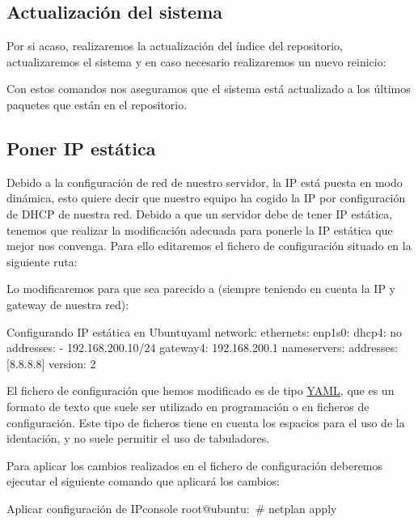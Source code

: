 \subsection{Actualización del sistema}
Por si acaso, realizaremos la actualización del índice del repositorio, actualizaremos el sistema y en caso necesario realizaremos un nuevo reinicio:


Con estos comandos nos aseguramos que el sistema está actualizado a los últimos paquetes que están en el repositorio.

\subsection{Poner IP estática}
Debido a la configuración de red de nuestro servidor, la IP está puesta en modo dinámica, esto quiere decir que nuestro equipo ha cogido la IP por configuración de DHCP de nuestra red. Debido a que un servidor debe de tener IP estática, tenemos que realizar la modificación adecuada para ponerle la IP estática que mejor nos convenga. Para ello editaremos el fichero de configuración situado en la siguiente ruta: 

Lo modificaremos para que sea parecido a (siempre teniendo en cuenta la IP y gateway de nuestra red):


\begin{mycode}{Configurando IP estática en Ubuntu}{yaml}{}
network:
  ethernets:
    enp1s0:
      dhcp4: no
      addresses:
      - 192.168.200.10/24
      gateway4: 192.168.200.1
      nameservers:
        addresses: [8.8.8.8]
  version: 2
\end{mycode}

El fichero de configuración que hemos modificado es de tipo \href{https://es.wikipedia.org/wiki/YAML}{YAML}, que es un formato de texto que suele ser utilizado en programación o en ficheros de configuración. Este tipo de ficheros tiene en cuenta los espacios para el uso de la identación, y no suele permitir el uso de tabuladores.

Para aplicar los cambios realizados en el fichero de configuración deberemos ejecutar el siguiente comando que aplicará los cambios:

\begin{mycode}{Aplicar configuración de IP}{console}{}
root@ubuntu:~# netplan apply
\end{mycode}

\clearpage